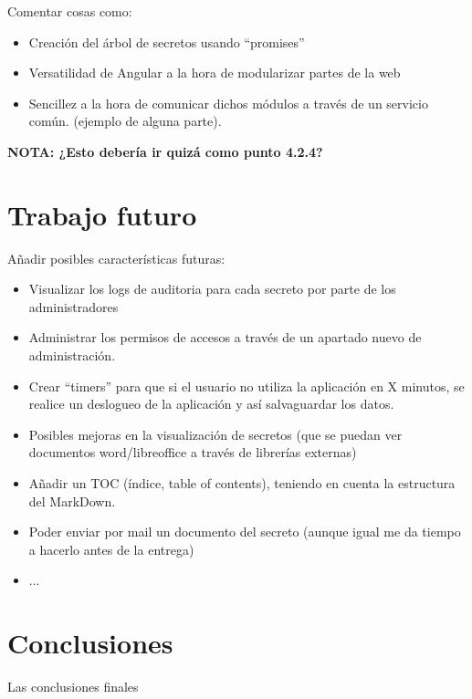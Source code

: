 \documentclass{\ClassPath/viu-tfm-template}
\begin{document}
{\color{red} Comentar cosas como:

    \begin{itemize}
        \item Creación del árbol de secretos usando “promises”
        \item Versatilidad de Angular a la hora de modularizar partes de la web
        \item Sencillez a la hora de comunicar dichos módulos a través de un servicio común. (ejemplo de alguna parte).
    \end{itemize}

{{\large \textbf{NOTA: ¿Esto debería ir quizá como punto 4.2.4?}}}
}





\chapter{Trabajo futuro}



{\color{red} Añadir posibles características futuras:

    \begin{itemize}
        \item Visualizar los logs de auditoria para cada secreto por parte de los administradores
        \item Administrar los permisos de accesos a través de un apartado nuevo de administración.
        \item Crear “timers” para que si el usuario no utiliza la aplicación en X minutos, se realice un deslogueo de la aplicación y así salvaguardar los datos.
        \item Posibles mejoras en la visualización de secretos (que se puedan ver documentos word/libreoffice a través de librerías externas)
        \item Añadir un TOC (índice, table of contents), teniendo en cuenta la estructura del MarkDown.
        \item Poder enviar por mail un documento del secreto (aunque igual me da tiempo a hacerlo antes de la entrega)
        \item ...
    \end{itemize}
}



\chapter{Conclusiones}
{\color{red} Las conclusiones finales}

\vfill

\pagebreak
\printbibliography[title={Referencias bibliográficas},heading=bibintoc]
\pagebreak

{
    \hypersetup{linkcolor = black}
    \listoffigures
}
\end{document}

